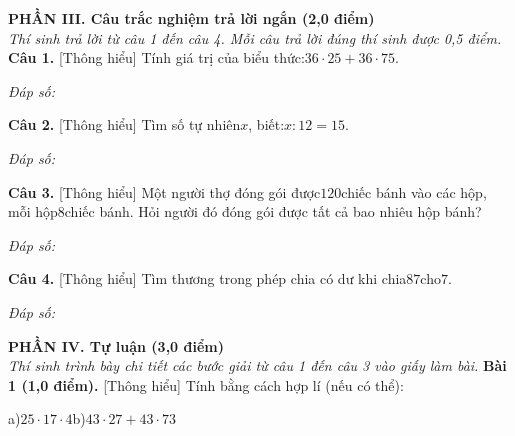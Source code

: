 \documentclass[11pt,a4paper]{article}
\begin{document}
\vspace{6pt}
\noindent
\textbf{\large PHẦN III. Câu trắc nghiệm trả lời ngắn (2,0 điểm)}\\
\textit{\small Thí sinh trả lời từ câu 1 đến câu 4. Mỗi câu trả lời đúng thí sinh được 0,5 điểm.}
\vspace{6pt}
\noindent\textbf{Câu 1.} [Thông hiểu] Tính giá trị của biểu thức:$36 \cdot 25 + 36 \cdot 75$.\par\vspace{2pt}
\noindent\textit{Đáp số:} \dotfill\par\vspace{6pt}

\noindent\textbf{Câu 2.} [Thông hiểu] Tìm số tự nhiên$x$, biết:$x : 12 = 15$.\par\vspace{2pt}
\noindent\textit{Đáp số:} \dotfill\par\vspace{6pt}

\noindent\textbf{Câu 3.} [Thông hiểu] Một người thợ đóng gói được$120$chiếc bánh vào các hộp, mỗi hộp$8$chiếc bánh. Hỏi người đó đóng gói được tất cả bao nhiêu hộp bánh?\par\vspace{2pt}
\noindent\textit{Đáp số:} \dotfill\par\vspace{6pt}

\noindent\textbf{Câu 4.} [Thông hiểu] Tìm thương trong phép chia có dư khi chia$87$cho$7$.\par\vspace{2pt}
\noindent\textit{Đáp số:} \dotfill\par\vspace{6pt}


\vspace{6pt}
\noindent
\textbf{\large PHẦN IV. Tự luận (3,0 điểm)}\\
\textit{\small Thí sinh trình bày chi tiết các bước giải từ câu 1 đến câu 3 vào giấy làm bài.}
\vspace{6pt}
\noindent\textbf{Bài 1 (1,0 điểm).} [Thông hiểu] Tính bằng cách hợp lí (nếu có thể):\par\noindent a)$25 \cdot 17 \cdot 4$b)$43 \cdot 27 + 43 \cdot 73$\par\vspace{8pt}
\end{document}
